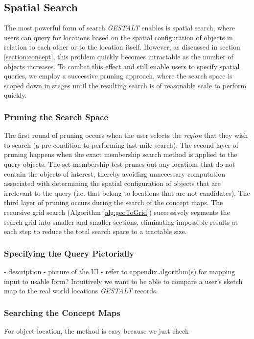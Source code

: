\subsection{Spatial Search}

The most powerful form of search \emph{GESTALT} enables is spatial search, where users can query for locations based on the spatial configuration of objects in relation to each other or to the location itself.
However, as discussed in section \ref{section:concept}, this problem quickly becomes intractable as the number of objects increases.
To combat this effect and still enable users to specify spatial queries, we employ a successive pruning approach, where the search space is scoped down in stages until the resulting search is of reasonable scale to perform quickly.

\subsubsection{Pruning the Search Space}
The first round of pruning occurs when the user selects the \emph{region} that they wish to search (a pre-condition to performing last-mile search). 
The second layer of pruning happens when the exact membership search method is applied to the query objects.
The set-membership test prunes out any locations that do not contain the objects of interest, thereby avoiding unnecessary computation associated with determining the spatial configuration of objects that are irrelevant to the query (i.e. that belong to locations that are not candidates).
The third layer of pruning occurs during the search of the concept maps. 
The recursive grid search (Algorithm \ref{alg:geoToGrid}) successively segments the search grid into smaller and smaller sections, eliminating impossible results at each step to reduce the total search space to a tractable size.

\subsubsection{Specifying the Query Pictorially}
- description
- picture of the UI
- refer to appendix algorithm(s) for mapping input to usable form?
Intuitively we want to be able to compare a user's sketch map to the real world locations \emph{GESTALT} records. 

\subsubsection{Searching the Concept Maps}
For object-location, the method is easy because we just check 

